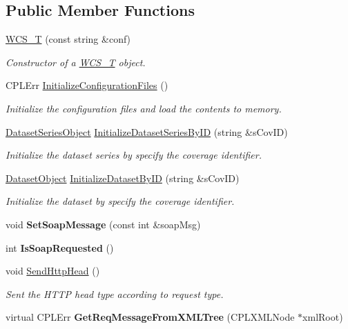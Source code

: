 \subsection*{Public Member Functions}
\begin{DoxyCompactItemize}
\item 
\hyperlink{classWCS__T_a1bd0d238dffd912d223aa31709338f38}{WCS\_\-T} (const string \&conf)
\begin{DoxyCompactList}\small\item\em Constructor of a \hyperlink{classWCS__T}{WCS\_\-T} object. \end{DoxyCompactList}\item 
CPLErr \hyperlink{classWCS__T_a2edb33250f0cd0708e156197145d85ad}{InitializeConfigurationFiles} ()
\begin{DoxyCompactList}\small\item\em Initialize the configuration files and load the contents to memory. \end{DoxyCompactList}\item 
\hyperlink{classDatasetSeriesObject}{DatasetSeriesObject} \hyperlink{classWCS__T_ad100a5da6a0c7e7a95875ab19c2343a8}{InitializeDatasetSeriesByID} (string \&sCovID)
\begin{DoxyCompactList}\small\item\em Initialize the dataset series by specify the coverage identifier. \end{DoxyCompactList}\item 
\hyperlink{classDatasetObject}{DatasetObject} \hyperlink{classWCS__T_af4fe8b9d94363b4c9e3b6ce9f3097e1e}{InitializeDatasetByID} (string \&sCovID)
\begin{DoxyCompactList}\small\item\em Initialize the dataset by specify the coverage identifier. \end{DoxyCompactList}\item 
\hypertarget{classWCS__T_ab81521d2a98b5b0e9f438d26873655d5}{
void {\bfseries SetSoapMessage} (const int \&soapMsg)}
\label{classWCS__T_ab81521d2a98b5b0e9f438d26873655d5}

\item 
\hypertarget{classWCS__T_a558a55cd04ce9366d5412cf62731dd65}{
int {\bfseries IsSoapRequested} ()}
\label{classWCS__T_a558a55cd04ce9366d5412cf62731dd65}

\item 
void \hyperlink{classWCS__T_a9f29625a62a2a75cb9a258b8949e9496}{SendHttpHead} ()
\begin{DoxyCompactList}\small\item\em Sent the HTTP head type according to request type. \end{DoxyCompactList}\item 
\hypertarget{classWCS__T_a1476aba462b825963ac9330ba711038c}{
virtual CPLErr {\bfseries GetReqMessageFromXMLTree} (CPLXMLNode $\ast$xmlRoot)}
\label{classWCS__T_a1476aba462b825963ac9330ba711038c}


\end{DoxyCompactItemize}
